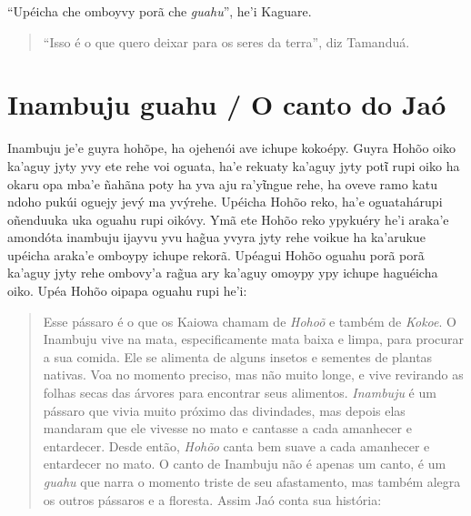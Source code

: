 \begin{itemize}
``Upéicha che omboyvy porã che \emph{guahu}'', he'i Kaguare.

\begin{quote}
``Isso é o que quero deixar para os seres da terra'', diz Tamanduá.
\end{quote}

\chapter{Inambuju guahu / O canto do Jaó}

Inambuju je'e guyra hohõpe, ha ojehenói ave ichupe kokoépy. Guyra Hohõo
oiko ka'aguy jyty yvy ete rehe voi oguata, ha'e rekuaty ka'aguy jyty
potῖ rupi oiko ha okaru opa mba'e ñahãna poty ha yva aju ra'yῖngue rehe,
ha oveve ramo katu ndoho pukúi oguejy jevý ma yvýrehe. Upéicha Hohõo
reko, ha'e oguatahárupi oñenduuka uka oguahu rupi oikóvy. Ymã ete Hohõo
reko ypykuéry he'i araka'e amondóta inambuju ijayvu yvu hag̃ua yvyra jyty
rehe voikue ha ka'arukue upéicha araka'e omboypy ichupe rekorã. Upéagui
Hohõo oguahu porã porã ka'aguy jyty rehe ombovy'a rag̃ua ary ka'aguy
omoypy ypy ichupe haguéicha oiko. Upéa Hohõo oipapa oguahu rupi he'i:

\begin{quote}
Esse pássaro é o que os Kaiowa chamam de \emph{Hohoõ} e também de
\emph{Kokoe}. O Inambuju vive na mata, especificamente mata baixa e
limpa, para procurar a sua comida. Ele se alimenta de alguns insetos e
sementes de plantas nativas. Voa no momento preciso, mas não muito
longe, e vive revirando as folhas secas das árvores para encontrar seus
alimentos. \emph{Inambuju} é um pássaro que vivia muito próximo das
divindades, mas depois elas mandaram que ele vivesse no mato e cantasse
a cada amanhecer e entardecer. Desde então, \emph{Hohõo} canta bem suave
a cada amanhecer e entardecer no mato. O canto de Inambuju não é apenas
um canto, é um \emph{guahu} que narra o momento triste de seu
afastamento, mas também alegra os outros pássaros e a floresta. Assim
Jaó conta sua história:
\end{quote}



\end{itemize}
